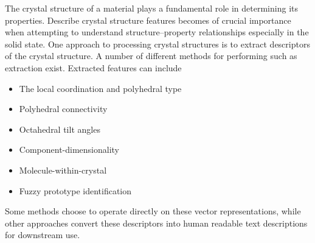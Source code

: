 \documentclass[book.tex]{subfiles}
\begin{document}
The crystal structure of a material plays a fundamental role in determining its properties. Describe crystal structure features becomes of crucial importance when attempting to understand structure–property relationships especially in the solid state. One approach to processing crystal structures is to extract descriptors of the crystal structure.
A number of different methods for performing such as extraction exist. Extracted features can include 
\begin{itemize}
    \item The local coordination and polyhedral type
    \item Polyhedral connectivity
    \item Octahedral tilt angles
    \item Component-dimensionality
    \item Molecule-within-crystal
    \item Fuzzy prototype identification
\end{itemize} 
Some methods choose to operate directly on these vector representations, while other approaches convert these descriptors into human readable text descriptions for downstream use.
\end{document}
